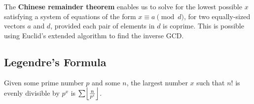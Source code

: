 \documentclass[../main]{subfiles}
\begin{document}
    The \textbf{Chinese remainder theorem} enables us to solve for the lowest possible $x$ satisfying a system of equations of the form $x\equiv a \pmod {d}$, for two equally-sized vectors $a$ and $d$, provided each pair of elements in $d$ is coprime. This is possible using Euclid's extended algorithm to find the inverse GCD.
    

    \subsection{Legendre's Formula}

    Given some prime number $p$ and some $n$, the largest number $x$ such that $n!$ is evenly divisible by $p^x$ is $\sum\floor*{\frac{n}{p^i}}$.
\end{document}
